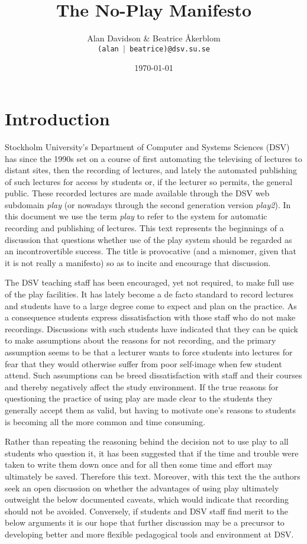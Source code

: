 \documentclass[a4paper,10pt]{article}
\title{The No-Play Manifesto}
\author{Alan Davidson \& Beatrice Åkerblom\\ 
  \texttt{(alan $|$ beatrice)@dsv.su.se}}
\date{\today}
\begin{document}
\maketitle
\tableofcontents

\section{Introduction}
Stockholm University's Department of Computer and Systems Sciences (DSV) has since the 1990s set on a course of first automating the televising of lectures to distant sites, then the recording of lectures, and lately the automated publishing of such lectures for access by students or, if the lecturer so permits, the general public. These recorded lectures are made available through the DSV web subdomain \emph{play} (or nowadays through the second generation version \emph{play2}). In this document we use the term \emph{play} to refer to the system for automatic recording and publishing of lectures. This text represents the beginnings of a discussion that questions whether use of the play system should be regarded as an incontrovertible success.  The title is provocative (and a misnomer, given that it is not really a manifesto) so as to incite and encourage that discussion. 

The DSV teaching staff has been encouraged, yet not required, to make full use of the play facilities. It has lately become a de facto standard to record lectures and students have to a large degree come to expect and plan on the practice. As a consequence students express dissatisfaction with those staff who do not make recordings. Discussions with such students have indicated that they can be quick to make assumptions about the reasons for not recording, and the primary assumption seems to be that a lecturer wants to force students into lectures for fear that they would otherwise suffer from poor self-image when few student attend. Such assumptions can be breed dissatisfaction with staff and their courses and thereby negatively affect the study environment. If the true reasons for questioning the practice of using play are made clear to the students they generally accept them as valid, but having to motivate one's reasons to students is becoming all the more common and time consuming.

Rather than repeating the reasoning behind the decision not to use play to all students who question it, it has been suggested that if the time and trouble were taken to write them down once and for all then some time and effort may ultimately be saved. Therefore this text. Moreover, with this text the the authors seek an open discussion on whether the advantages of using play ultimately outweight the below documented caveats, which would indicate that recording should not be avoided. Conversely, if students and DSV staff find merit to the below arguments it is our hope that further discussion may be a precursor to developing better and more flexible pedagogical tools and environment at DSV. 
\end{document}

